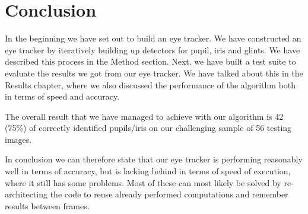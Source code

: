 \section{Conclusion}

In the beginning we have set out to build an eye tracker. We have constructed an eye tracker by iteratively building up detectors for pupil, iris and glints. We have described this process in the Method section. Next, we have built a test suite to evaluate the results we got from our eye tracker. We have talked about this in the Results chapter, where we also discussed the performance of the algorithm both in terms of speed and accuracy. 

The overall result that we have managed to achieve with our algorithm is 42 (75\%) of correctly identified pupils/iris on our challenging sample of 56 testing images.

In conclusion we can therefore state that our eye tracker is performing reasonably well in terms of accuracy, but is lacking behind in terms of speed of execution, where it still has some problems. Most of these can most likely be solved by re-architecting the code to reuse already performed computations and remember results between frames.
